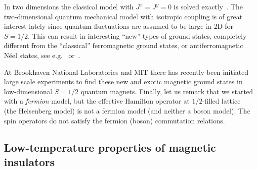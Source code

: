 In two dimensions the classical model with $J^x = J^y = 0$ is solved exactly~\cite{onsager1943}. The two-dimensional quantum mechanical model with isotropic coupling is of great 
interest lately since quantum fluctuations are assumed to be large in $2$D for $S=1/2$. This can result in interesting ``new'' types of ground states, completely different from the
``classical'' ferromagnetic ground states, or antiferromagnetic N\'{e}el states, see e.g.~\cite{chakravarty1989} or~\cite{chubukov1993}.

At Brookhaven National Laboratories and MIT there has recently been initiated large scale experiments to find these new and exotic magnetic ground states
in low-dimensional $S=1/2$ quantum magnets. Finally, let us remark that we started with a \emph{fermion} model, but the effective Hamilton operator at $1/2$-filled lattice
(the Heisenberg model) is not a fermion model (and neither a boson model). The spin operators do not satisfy the fermion (boson) commutation relations.



\subsection{Low-temperature properties of magnetic insulators}
